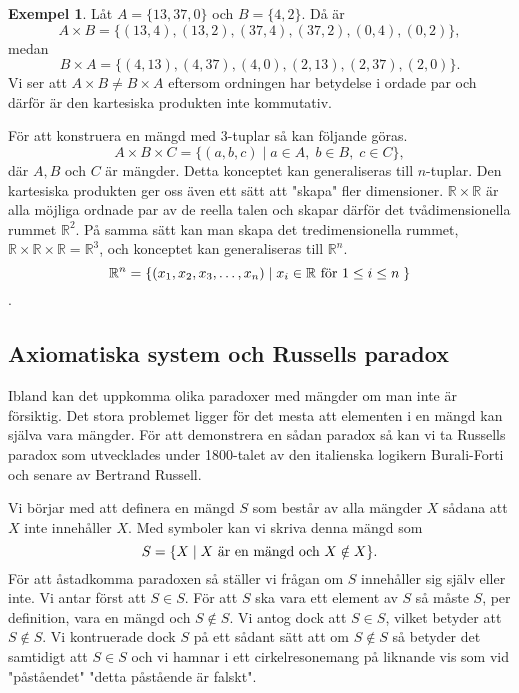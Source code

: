 \documentclass{article}
\theoremstyle{definition}
\newtheorem{exmp}[thm]{Exempel}
\begin{document}
\begin{exmp}
  Låt $A = \{13, 37, 0\}$ och $B = \{4, 2\}$. Då är
\[A \times B = \{ (13, 4), (13, 2), (37, 4), (37, 2), (0, 4), (0, 2) \},\]
medan 
\[B \times A = \{ (4, 13), (4, 37), (4, 0), (2, 13), (2, 37), (2, 0) \}.\]
Vi ser att $A \times B \neq B \times A$ eftersom ordningen
har betydelse i ordade par och därför är den kartesiska produkten inte kommutativ. 
\end{exmp}
För att konstruera en mängd med $3$-tuplar så kan följande göras.
\[A \times B \times C = \{ (a, b, c) \; | \; a \in A, \; b \in B, \; c \in C \},\]
där $A, B$ och $C$ är mängder. Detta konceptet kan generaliseras till $n$-tuplar. 
Den kartesiska produkten ger oss även ett sätt att "skapa" fler dimensioner.
$\mathbb{R} \times \mathbb{R}$ är alla möjliga ordnade par av de reella talen och skapar därför det 
tvådimensionella rummet $\mathbb{R}^2$. På samma sätt kan man skapa det tredimensionella rummet,
$\mathbb{R} \times \mathbb{R} \times \mathbb{R} = \mathbb{R}^3$, och konceptet kan generaliseras till 
$\mathbb{R}^n$. 
\[\mathbb{R}^n = \{(x_1, x_2, x_3, \ldots, x_n) \; | \; x_i \in \mathbb{R} \textnormal{ för } 1 
\leq i \leq n\; \} \].


\subsection{Axiomatiska system och Russells paradox}
Ibland kan det uppkomma olika paradoxer med mängder om man inte är försiktig. Det stora problemet 
ligger för det mesta att elementen i en mängd kan själva vara mängder. För att demonstrera en sådan 
paradox så kan vi ta Russells paradox som utvecklades under 1800-talet av den italienska logikern Burali-Forti
och senare av Bertrand Russell. 

Vi börjar med att definera en mängd $S$ som består av alla mängder $X$ sådana att $X$ inte innehåller 
$X$. Med symboler kan vi skriva denna mängd som
\[S = \{X \; | \; X \textnormal{ är en mängd och } X \notin X  \}. \]
För att åstadkomma paradoxen så ställer vi frågan om $S$ innehåller sig själv eller inte. 
Vi antar först att $S \in S$.
För att $S$ ska vara ett element av $S$ så 
måste $S$, per definition, vara en mängd och $S \notin S$.
Vi antog dock att $S \in S$, vilket betyder att $S \notin S$. Vi kontruerade dock $S$ på ett sådant sätt att om $S \notin S$ så betyder det samtidigt att $S \in S$ och vi hamnar i ett
cirkelresonemang på liknande vis som vid "påståendet" "detta påstående är falskt".
\end{document}
